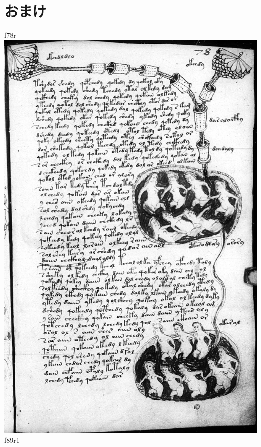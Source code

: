 \documentclass[a4paper,7pt]{jsarticle}
\begin{document}
\section{おまけ}
f78r
\includegraphics[width=15cm]{f78r.jpg}
\newpage
f89r1
\end{document}
